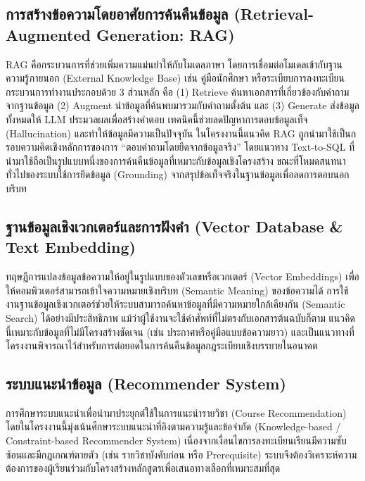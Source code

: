 \subsection{การสร้างข้อความโดยอาศัยการค้นคืนข้อมูล (Retrieval-Augmented Generation: RAG)}

RAG \cite{lewis2020rag} คือกระบวนการที่ช่วยเพิ่มความแม่นยำให้กับโมเดลภาษา โดยการเชื่อมต่อโมเดลเข้ากับฐานความรู้ภายนอก (External Knowledge Base) เช่น คู่มือนักศึกษา หรือระเบียบการลงทะเบียน กระบวนการทำงานประกอบด้วย 3 ส่วนหลัก คือ (1) Retrieve ค้นหาเอกสารที่เกี่ยวข้องกับคำถามจากฐานข้อมูล (2) Augment นำข้อมูลที่ค้นพบมารวมกับคำถามตั้งต้น และ (3) Generate ส่งข้อมูลทั้งหมดให้ LLM ประมวลผลเพื่อสร้างคำตอบ เทคนิคนี้ช่วยลดปัญหาการตอบข้อมูลเท็จ (Hallucination) และทำให้ข้อมูลมีความเป็นปัจจุบัน ในโครงงานนี้แนวคิด RAG ถูกนำมาใช้เป็นกรอบความคิดเชิงหลักการของการ ``ตอบคำถามโดยยึดจากข้อมูลจริง'' โดยแนวทาง Text-to-SQL ที่นำมาใช้ถือเป็นรูปแบบหนึ่งของการค้นคืนข้อมูลที่เหมาะกับข้อมูลเชิงโครงสร้าง ขณะที่โหมดสนทนาทั่วไปของระบบใช้การยึดข้อมูล (Grounding) จากสรุปข้อเท็จจริงในฐานข้อมูลเพื่อลดการตอบนอกบริบท

\subsection{ฐานข้อมูลเชิงเวกเตอร์และการฝังคำ (Vector Database \& Text Embedding)}

ทฤษฎีการแปลงข้อมูลข้อความให้อยู่ในรูปแบบของตัวเลขหรือเวกเตอร์ (Vector Embeddings) เพื่อให้คอมพิวเตอร์สามารถเข้าใจความหมายเชิงบริบท (Semantic Meaning) ของข้อความได้ การใช้งานฐานข้อมูลเชิงเวกเตอร์ช่วยให้ระบบสามารถค้นหาข้อมูลที่มีความหมายใกล้เคียงกัน (Semantic Search) ได้อย่างมีประสิทธิภาพ แม้ว่าผู้ใช้งานจะใช้คำศัพท์ที่ไม่ตรงกับเอกสารต้นฉบับก็ตาม แนวคิดนี้เหมาะกับข้อมูลที่ไม่มีโครงสร้างชัดเจน (เช่น ประกาศหรือคู่มือแบบข้อความยาว) และเป็นแนวทางที่โครงงานพิจารณาไว้สำหรับการต่อยอดในการค้นคืนข้อมูลกฎระเบียบเชิงบรรยายในอนาคต

\subsection{ระบบแนะนำข้อมูล (Recommender System)}

การศึกษาระบบแนะนำเพื่อนำมาประยุกต์ใช้ในการแนะนำรายวิชา (Course Recommendation) โดยในโครงงานนี้มุ่งเน้นศึกษาระบบแนะนำที่อิงตามความรู้และข้อจำกัด (Knowledge-based / Constraint-based Recommender System) เนื่องจากเงื่อนไขการลงทะเบียนเรียนมีความซับซ้อนและมีกฎเกณฑ์ตายตัว (เช่น รายวิชาบังคับก่อน หรือ Prerequisite) ระบบจึงต้องวิเคราะห์ความต้องการของผู้เรียนร่วมกับโครงสร้างหลักสูตรเพื่อเสนอทางเลือกที่เหมาะสมที่สุด

